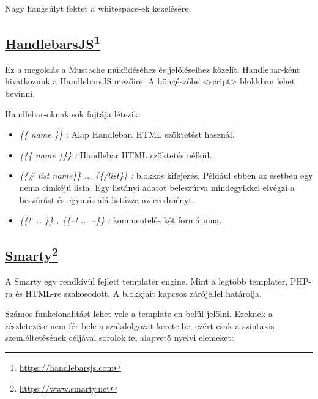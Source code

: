 Nagy hangsúlyt fektet a whitespace-ek kezelésére.

\subsection[HandlebarsJS]{\href{https://handlebarsjs.com}{HandlebarsJS}\footnote{\url{https://handlebarsjs.com}}}
\label{sec:hjs}
Ez a megoldás a Mustache működéséhez és jelöléseihez közelít.
Handlebar-ként hivatkozunk a HandlebarsJS mezőire.
A böngészőbe <script> blokkban lehet bevinni.


Handlebar-oknak sok fajtája létezik:
\begin{itemize}
\item \emph{\textit{\{\{ name \}\}} :} 
Alap Handlebar.
HTML szöktetést használ.
\item \emph{\textit{\{\{\{ name \}\}\}} :} 
Handlebar HTML szöktetés nélkül.
\item \emph{\textit{\{\{\# list name\}\} ... \{\{/list\}\} }:} 
blokkos kifejezés.
Például ebben az esetben egy nema címkéjű lista.
Egy listányi adatot beleszúrva mindegyikkel elvégzi a beszúrást és egymás alá listázza az eredményt.
\item \emph{\textit{\{\{! ... \}\} , \{\{--! ... --\}\}} :} kommentelés két formátuma.
\end{itemize}


\subsection[Smarty]{\href{https://www.smarty.net}{Smarty}\footnote{\url{https://www.smarty.net}}}
\label{sec:smarty}
A Smarty egy rendkívül fejlett templater engine.
Mint a legtöbb templater, PHP-ra és  HTML-re szakosodott.
A blokkjait kapcsos zárójellel határolja.

Számos funkcionalitást lehet vele a template-en belül jelölni.
Ezeknek a részletezése nem fér bele a szakdolgozat kereteibe, ezért csak a szintaxis szemléltetésének céljával sorolok fel alapvető nyelvi elemeket:

